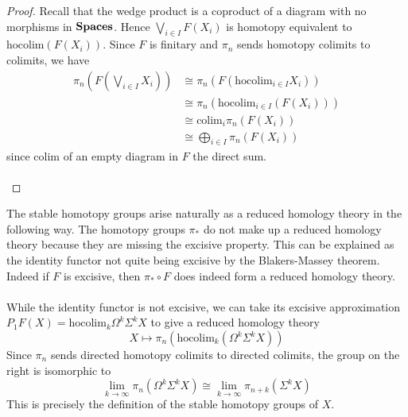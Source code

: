 \documentclass[a4paper]{article}
\begin{document}
\begin{thm}{}{}
\begin{proof}
Recall that the wedge product is a coproduct of a diagram with no morphisms in $\bold{Spaces}$. Hence $\bigvee_{i\in I}F(X_i)$ is homotopy equivalent to $\text{hocolim}(F(X_i))$. Since $F$ is finitary and $\pi_n$ sends homotopy colimits to colimits, we have 
\begin{align*}
\pi_n\left(F\left(\bigvee_{i\in I}X_i\right)\right)&\cong\pi_n(F(\text{hocolim}_{i\in I}X_i))\\
&\cong\pi_n(\text{hocolim}_{i\in I}(F(X_i)))\\
&\cong\text{colim}_i\pi_n(F(X_i))\\
&\cong\bigoplus_{i\in I}\pi_n(F(X_i))
\end{align*}
since $\text{colim}$ of an empty diagram in $F$ the direct sum. \\~\\
\end{proof}
\end{thm}

\begin{eg}{}{} The stable homotopy groups arise naturally as a reduced homology theory in the following way. The homotopy groups $\pi_\ast$ do not make up a reduced homology theory because they are missing the excisive property. This can be explained as the identity functor not quite being excisive by the Blakers-Massey theorem. Indeed if $F$ is excisive, then $\pi_\ast\circ F$ does indeed form a reduced homology theory. \\~\\

While the identity functor is not excisive, we can take its excisive approximation $P_1F(X)=\text{hocolim}_k\Omega^k\Sigma^k X$ to give a reduced homology theory $$X\mapsto\pi_n(\text{hocolim}_k(\Omega^k\Sigma^kX))$$ Since $\pi_n$ sends directed homotopy colimits to directed colimits, the group on the right is isomorphic to $$\lim_{k\to\infty}\pi_n(\Omega^k\Sigma^k X)\cong\lim_{k\to\infty}\pi_{n+k}(\Sigma^k X)$$ This is precisely the definition of the stable homotopy groups of $X$. 
\end{eg}
\end{document}
